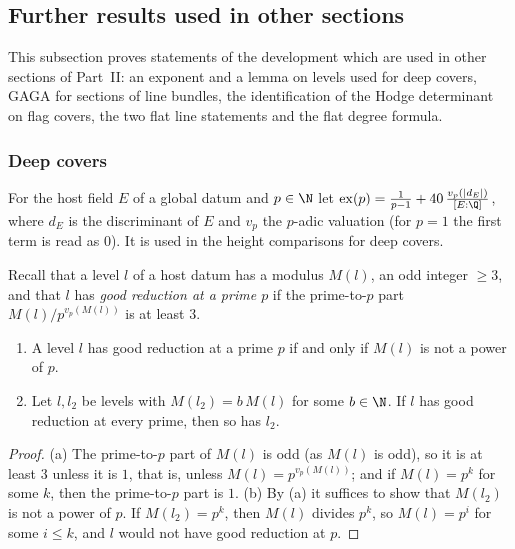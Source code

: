 \subsection{Further results used in other sections}\label{sec:pf:covol:further}

This subsection proves statements of the development which are used in other sections of Part~II: an
exponent and a lemma on levels used for deep covers, GAGA for sections of line bundles, the identification
of the Hodge determinant on flag covers, the two flat line statements and the flat degree formula.

\subsubsection*{Deep covers}

\begin{definition}\label{pf:covol:def:htex}
For the host field $E$ of a global datum and $p\in\N$ let
$\mathrm{ex}(p)=\frac1{p-1}+40\,\frac{v_p(|d_E|)}{[E:\Q]}$, where $d_E$ is the discriminant of $E$ and
$v_p$ the $p$-adic valuation (for $p=1$ the first term is read as $0$). It is used in the height comparisons
for deep covers.
\end{definition}

Recall that a level $l$ of a host datum has a modulus $M(l)$, an odd integer $\ge3$, and that $l$ has
\emph{good reduction at a prime $p$} if the prime-to-$p$ part $M(l)/p^{v_p(M(l))}$ is at least $3$.

\begin{lemma}\label{pf:covol:lem:goodmul}
\begin{enumerate}[label=(\alph*)]
\item A level $l$ has good reduction at a prime $p$ if and only if $M(l)$ is not a power of $p$.
\item Let $l,l_2$ be levels with $M(l_2)=b\,M(l)$ for some $b\in\N$. If $l$ has good reduction at every
  prime, then so has $l_2$.
\end{enumerate}
\end{lemma}

\begin{proof}
(a) The prime-to-$p$ part of $M(l)$ is odd (as $M(l)$ is odd), so it is at least $3$ unless it is $1$,
that is, unless $M(l)=p^{v_p(M(l))}$; and if $M(l)=p^k$ for some $k$, then the prime-to-$p$ part is $1$.
(b) By (a) it suffices to show that $M(l_2)$ is not a power of $p$. If $M(l_2)=p^k$, then $M(l)$ divides $p^k$, so $M(l)=p^i$ for some $i\le k$, and $l$ would not
have good reduction at $p$.
\end{proof}


